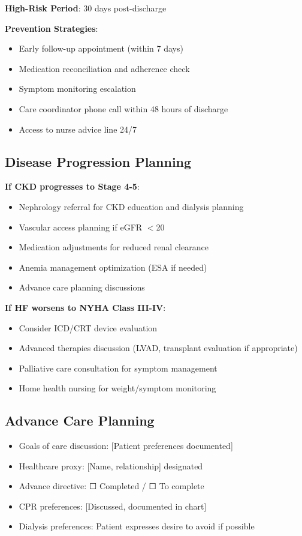 \documentclass[11pt,letterpaper]{article}
\begin{document}
\textbf{High-Risk Period}: 30 days post-discharge

\textbf{Prevention Strategies}:
\begin{itemize}[leftmargin=*]
    \item Early follow-up appointment (within 7 days)
    \item Medication reconciliation and adherence check
    \item Symptom monitoring escalation
    \item Care coordinator phone call within 48 hours of discharge
    \item Access to nurse advice line 24/7
\end{itemize}

\subsection*{Disease Progression Planning}

\textbf{If CKD progresses to Stage 4-5}:
\begin{itemize}[leftmargin=*]
    \item Nephrology referral for CKD education and dialysis planning
    \item Vascular access planning if eGFR $<$20
    \item Medication adjustments for reduced renal clearance
    \item Anemia management optimization (ESA if needed)
    \item Advance care planning discussions
\end{itemize}

\textbf{If HF worsens to NYHA Class III-IV}:
\begin{itemize}[leftmargin=*]
    \item Consider ICD/CRT device evaluation
    \item Advanced therapies discussion (LVAD, transplant evaluation if appropriate)
    \item Palliative care consultation for symptom management
    \item Home health nursing for weight/symptom monitoring
\end{itemize}

\subsection*{Advance Care Planning}

\begin{itemize}[leftmargin=*]
    \item Goals of care discussion: [Patient preferences documented]
    \item Healthcare proxy: [Name, relationship] designated
    \item Advance directive: ☐ Completed / ☐ To complete
    \item CPR preferences: [Discussed, documented in chart]
    \item Dialysis preferences: Patient expresses desire to avoid if possible
\end{itemize}
\end{document}
